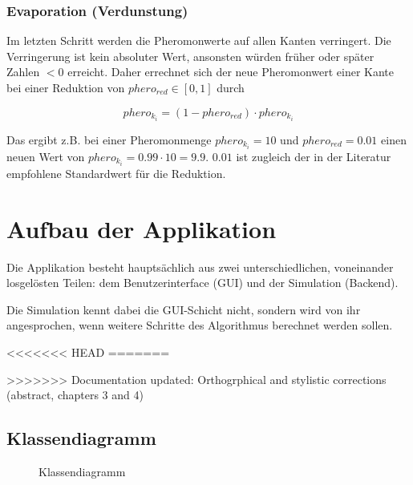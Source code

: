\subsubsection*{Evaporation (Verdunstung)}

Im letzten Schritt werden die Pheromonwerte auf allen Kanten verringert. Die Verringerung ist kein absoluter Wert, ansonsten würden früher oder später Zahlen $< 0$ erreicht. Daher errechnet sich der neue Pheromonwert einer Kante bei einer Reduktion von $phero_{red} \in [0, 1]$ durch

\[ phero_{k_i} = (1 - phero_{red}) \cdot phero_{k_i} \]

\noindent
Das ergibt z.B. bei einer Pheromonmenge $phero_{k_i} = 10$ und $phero_{red} = 0.01$ einen neuen Wert von $phero_{k_i} = 0.99 \cdot 10 = 9.9$. $0.01$ ist zugleich der in der Literatur empfohlene Standardwert für die Reduktion.




\section{Aufbau der Applikation}

Die Applikation besteht hauptsächlich aus zwei unterschiedlichen, voneinander losgelösten Teilen: dem Benutzerinterface (GUI) und der Simulation (Backend).

Die Simulation kennt dabei die GUI-Schicht nicht, sondern wird von ihr angesprochen, wenn weitere Schritte des Algorithmus berechnet werden sollen.

<<<<<<< HEAD
\pagebreak
=======


>>>>>>> Documentation updated: Orthogrphical and stylistic corrections (abstract, chapters 3 and 4)
\subsection{Klassendiagramm}

\begin{figure}[h]
    \centering
    \caption{Klassendiagramm}
\end{figure}

